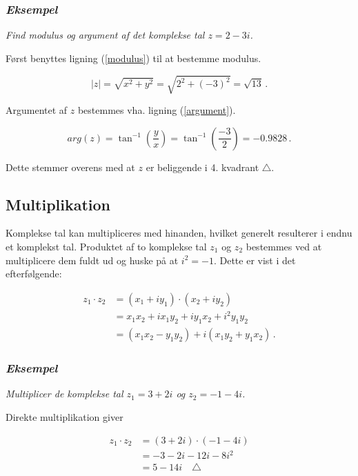 \documentclass[a4paper, 12pt,titlepage]{article}
\begin{document}
\subsubsection*{\emph{Eksempel}}
\label{sec:orgff3aa0b}
\emph{Find modulus og argument af det komplekse tal \(z=2-3i\).}

Først benyttes ligning (\ref{modulus}) til at bestemme modulus.

$$|z| = \sqrt{x^2+y^2} = \sqrt{2^2+(-3)^2} = \sqrt{13} \,.$$

Argumentet af \(z\) bestemmes vha. ligning (\ref{argument}).

$$arg(z) = \tan^{-1}\left(\frac{y}{x}\right) =\tan^{-1}\left(\frac{-3}{2}\right) =-0.9828 \,.$$

Dette stemmer overens med at \(z\) er beliggende i 4. kvadrant \(\triangle\).

\subsection{Multiplikation}
\label{sec:org0461aca}

Komplekse tal kan multipliceres med hinanden, hvilket generelt resulterer i endnu et komplekst tal. Produktet af to komplekse tal \(z_1\) og \(z_2\) bestemmes ved at multiplicere dem fuldt ud og huske på at \(i^2 = -1\). Dette er vist i det efterfølgende:

\begin{align*}
    z_1 \cdot z_2 &= (x_1 + i y_1) \cdot (x_2 + i y_2) \\
                  &= x_1 x _2 + i x_1 y_2 + i y_1 x_2 + i^2 y_1 y_2 \\
                  &= (x_1 x_2 - y_1 y_2) + i (x_1 y_2 + y_1 x_2) \, .
\end{align*}

\subsubsection*{\emph{Eksempel}}
\label{sec:orgf149bc4}
\emph{Multiplicer de komplekse tal \(z_1=3 + 2i\) og \(z_2 = -1 -4i\).}

Direkte multiplikation giver

\begin{align*}
    z_1 \cdot z_2 &= (3+2i) \cdot (-1 -4i) \\
                  &= -3 -2i - 12i -8 i^2 \\
                  &= 5-14i \quad \triangle
\end{align*}
\end{document}
